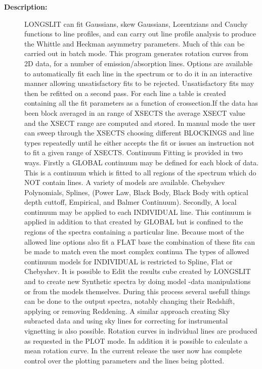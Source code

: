 \begin{description}
\begin{description}
\item [\textbf{Description:}]
   LONGSLIT can fit Gaussians, skew Gaussians, Lorentzians and Cauchy
   functions to line profiles, and can carry out line profile analysis to
   produce the Whittle and Heckman asymmetry parameters. Much of this
   can be carried out in batch mode.
     This program generates rotation curves from 2D data, for a number
   of emission/absorption lines.
     Options are available to automatically fit each line in the
   spectrum or to do it in an interactive manner allowing unsatisfactory
   fits to be rejected. Unsatisfactory fits may then be refitted on a
   second pass.
     For each line a table is created containing all the fit parameters
   as a function of crossection.If the data has been block averaged in
   an range of XSECTS the average XSECT value and the XSECT range are
   computed and stored.
     In manual mode the user can sweep through the XSECTS choosing
   different BLOCKINGS and line types repeatedly until he either
   accepts the fit or issues an instruction not to fit a given range of
   XSECTS.
     Continuum Fitting is provided in two ways. Firstly a GLOBAL
   continuum may be defined for each block of data. This is a continuum
   which is fitted to all regions of the spectrum which do NOT contain
   lines. A variety of models are available.
   Chebyshev Polynomials, Splines, (Power Law, Black Body, Black Body
   with optical depth cuttoff, Empirical, and Balmer Continuum).
   Secondly, A local continuum may be applied to each INDIVIDUAL
   line. This continuum is applied in addition to that created
   by GLOBAL but is confined to the regions of the spectra
   containing a particular line. Because most of the allowed
   line options also fit a FLAT base the combination of these
   fits can be made to match even the most complex continua
   The types of allowed continuum models for INDIVIDUAL is
   restricted to Spline, Flat or Chebyshev.
     It is possible to Edit the results cube created by LONGSLIT
   and to create new Synthetic spectra by doing model -data
   manipulations or from the models themselves. During this
   process several usefull things can be done to the output
   spectra, notably changing their Redshift, applying or
   removing Reddening.
     A similar approach creating Sky subracted data and using sky
   lines for correcting for instrumental vignetting is also possible.
     Rotation curves in individual lines are produced as requested in
   the PLOT mode. In addition it is possible to calculate a mean
   rotation curve. In the current release the user now has complete
   control over the plotting parameters and the lines being
   plotted.


\end{description}
\end{description}
